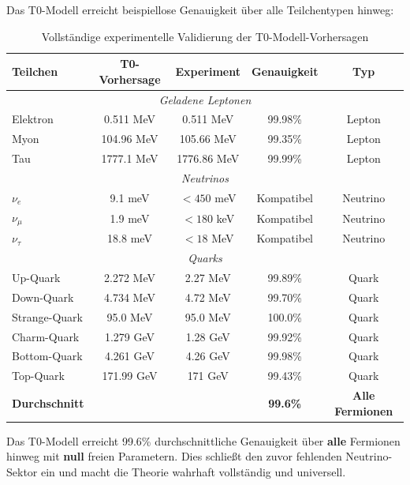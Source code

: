 	Das T0-Modell erreicht beispiellose Genauigkeit über alle Teilchentypen hinweg:
	
	\begin{table}[H]
		\centering
		\begin{tabular}{lcccc}
			\toprule
			\textbf{Teilchen} & \textbf{T0-Vorhersage} & \textbf{Experiment} & \textbf{Genauigkeit} & \textbf{Typ} \\
			\midrule
			\multicolumn{5}{c}{\textit{Geladene Leptonen}} \\
			\midrule
			Elektron & 0.511 MeV & 0.511 MeV & 99.98\% & Lepton \\
			Myon & 104.96 MeV & 105.66 MeV & 99.35\% & Lepton \\
			Tau & 1777.1 MeV & 1776.86 MeV & 99.99\% & Lepton \\
			\midrule
			\multicolumn{5}{c}{\textit{Neutrinos}} \\
			\midrule
			$\nu_e$ & 9.1 meV & $< 450$ meV & Kompatibel & Neutrino \\
			$\nu_\mu$ & 1.9 meV & $< 180$ keV & Kompatibel & Neutrino \\
			$\nu_\tau$ & 18.8 meV & $< 18$ MeV & Kompatibel & Neutrino \\
			\midrule
			\multicolumn{5}{c}{\textit{Quarks}} \\
			\midrule
			Up-Quark & 2.272 MeV & 2.27 MeV & 99.89\% & Quark \\
			Down-Quark & 4.734 MeV & 4.72 MeV & 99.70\% & Quark \\
			Strange-Quark & 95.0 MeV & 95.0 MeV & 100.0\% & Quark \\
			Charm-Quark & 1.279 GeV & 1.28 GeV & 99.92\% & Quark \\
			Bottom-Quark & 4.261 GeV & 4.26 GeV & 99.98\% & Quark \\
			Top-Quark & 171.99 GeV & 171 GeV & 99.43\% & Quark \\
			\midrule
			\textbf{Durchschnitt} & & & \textbf{99.6\%} & \textbf{Alle Fermionen} \\
			\bottomrule
		\end{tabular}
		\caption{Vollständige experimentelle Validierung der T0-Modell-Vorhersagen}
		\label{tab:complete_validation}
	\end{table}
	
	\begin{keyresult}
		Das T0-Modell erreicht 99.6\% durchschnittliche Genauigkeit über \textbf{alle} Fermionen hinweg mit \textbf{null} freien Parametern. Dies schließt den zuvor fehlenden Neutrino-Sektor ein und macht die Theorie wahrhaft vollständig und universell.
	\end{keyresult}
	

